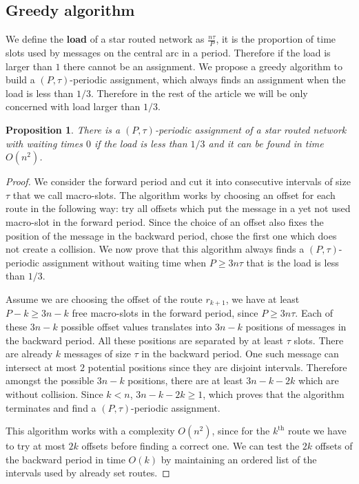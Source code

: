 \documentclass[10pt, conference, letterpaper]{IEEEtran}
\newtheorem{proposition}{Proposition}
\begin{document}
   
    \subsection{Greedy algorithm}
    
    
      We define the \textbf{load} of a star routed network as $\frac{n\tau}{P}$, it is the proportion of time slots used by messages on the central arc in a period. Therefore if the load is larger than $1$ there cannot be an assignment. We propose a greedy algorithm to build a $(P,\tau)$-periodic assignment, which always finds an assignment when the load is less than $1/3$. Therefore in the rest of the article we will be only concerned with load larger than $1/3$.
    
    \begin{proposition}
    There is a $(P,\tau)$-periodic assignment of a star routed network with waiting times $0$ if the load is less than $1/3$ and it can be found in time $O(n^2)$.
    \end{proposition}
    \begin{proof}
     We consider the forward period and cut it into consecutive intervals of size $\tau$ that we call macro-slots. The algorithm works by choosing an offset for each route in the following way: try all offsets which put the message in a yet not used macro-slot in the forward
     period. Since the choice of an offset also fixes the position of the message in the backward period, chose the first one which does not create a collision. We now prove that this algorithm always finds a $(P,\tau)$-periodic assignment without waiting time when $P \geq 3n\tau$ that is the load is less than $1/3$.
     
     Assume we are choosing the offset of the route $r_{k+1}$, we have at least $P - k \geq 3n - k$ free macro-slots in the forward period, since $P \geq 3n\tau$. Each of these $3n - k$ possible offset values translates into $3n - k$ positions of messages in the backward period. All these positions are separated by at least $\tau$ slots. There are already $k$ messages of size $\tau$ in the backward period. One such message can intersect at most $2$ potential positions since they are disjoint intervals. Therefore  amongst the possible $3n - k$ positions, there are  at least $3n - k -2k$ which are without collision. Since $k < n$, $3n - k -2k \geq 1$, which proves that the algorithm terminates and find a  $(P,\tau)$-periodic assignment. 
   
     This algorithm works with a complexity $O(n^2)$, since for the $k^{\text{th}}$ route we have to try at most $2k$ offsets before finding a correct one. We can test the $2k$ offsets of the backward period in time $O(k)$ by maintaining an ordered list of the intervals used by already set routes.
     \end{proof}
     
\end{document}
